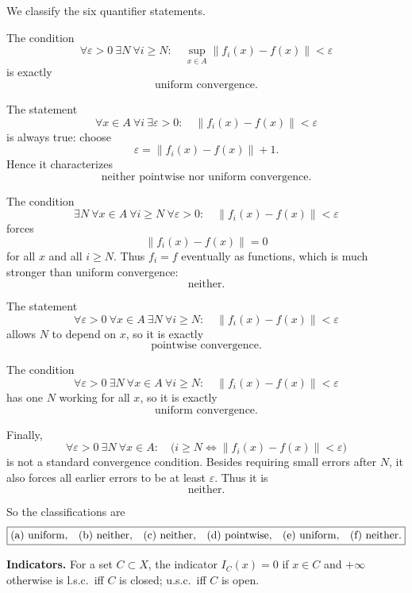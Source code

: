 \begin{solution}
We classify the six quantifier statements.

The condition
\[
\forall\varepsilon>0\ \exists N\ \forall i\ge N:
\quad
\sup_{x\in A}\|f_i(x)-f(x)\|<\varepsilon
\]
is exactly
\[
\boxed{\text{uniform convergence}.}
\]

The statement
\[
\forall x\in A\ \forall i\ \exists\varepsilon>0:
\quad
\|f_i(x)-f(x)\|<\varepsilon
\]
is always true: choose
\[
\varepsilon=\|f_i(x)-f(x)\|+1.
\]
Hence it characterizes
\[
\boxed{\text{neither pointwise nor uniform convergence}.}
\]

The condition
\[
\exists N\ \forall x\in A\ \forall i\ge N\ \forall\varepsilon>0:
\quad
\|f_i(x)-f(x)\|<\varepsilon
\]
forces
\[
\|f_i(x)-f(x)\|=0
\]
for all \(x\) and all \(i\ge N\). Thus \(f_i=f\) eventually as functions, which is much
stronger than uniform convergence:
\[
\boxed{\text{neither}.}
\]

The statement
\[
\forall\varepsilon>0\ \forall x\in A\ \exists N\ \forall i\ge N:
\quad
\|f_i(x)-f(x)\|<\varepsilon
\]
allows \(N\) to depend on \(x\), so it is exactly
\[
\boxed{\text{pointwise convergence}.}
\]

The condition
\[
\forall\varepsilon>0\ \exists N\ \forall x\in A\ \forall i\ge N:
\quad
\|f_i(x)-f(x)\|<\varepsilon
\]
has one \(N\) working for all \(x\), so it is exactly
\[
\boxed{\text{uniform convergence}.}
\]

Finally,
\[
\forall\varepsilon>0\ \exists N\ \forall x\in A:
\quad
\bigl(
i\ge N
\iff
\|f_i(x)-f(x)\|<\varepsilon
\bigr)
\]
is not a standard convergence condition. Besides requiring small errors after \(N\), it also
forces all earlier errors to be at least \(\varepsilon\). Thus it is
\[
\boxed{\text{neither}.}
\]

So the classifications are
\[
\boxed{
\text{(a) uniform,\quad
(b) neither,\quad
(c) neither,\quad
(d) pointwise,\quad
(e) uniform,\quad
(f) neither.}
}
\]
\end{solution}


\begin{problem}[CP-II-0243]
\label{prob:cp-ii-0243}
\textbf{Indicators.} For a set $C\subset X$, the indicator
		$I_C(x)=0$ if $x\in C$ and $+\infty$ otherwise is l.s.c.\ iff $C$ is closed;
		u.s.c.\ iff $C$ is open.
\end{problem}

